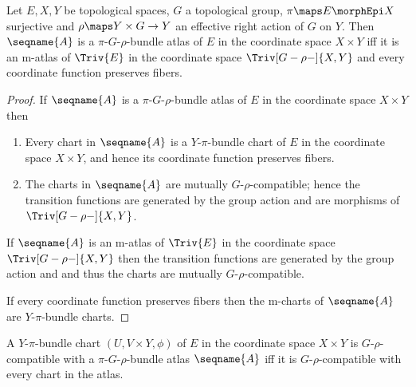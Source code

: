 \documentclass{article}
\begin{document}
\begin{lemma}
\label{lem:BunAtl}
Let $E,X,Y$ be topological spaces, $G$ a topological group,
$\pi \maps E \morphEpi X$ surjective and $\rho \maps Y \times G \to Y$ an
effective right action of $G$ on $Y$. Then $\seqname{A}$ is a
$\pi$-$G$-$\rho$-bundle atlas of $E$ in the coordinate space
$X \times Y$ iff it is an m-atlas of $\Triv{E}$ in the coordinate space
$\Triv[G-\rho-]{X,Y}$ and every coordinate function preserves fibers.

\begin{proof}
If $\seqname{A}$ is a $\pi$-$G$-$\rho$-bundle atlas of $E$ in the
coordinate space $X \times Y$ then
\begin{enumerate}
\item Every chart in $\seqname{A}$ is a $Y$-$\pi$-bundle chart of $E$ in
the coordinate space $X \times Y$, and hence its coordinate function
preserves fibers.
\item The charts in $\seqname{A}$ are mutually $G$-$\rho$-compatible;
hence the transition functions are generated by the group action and are
morphisms of $\Triv[G-\rho-]{X,Y}$.
\end{enumerate}

If $\seqname{A}$ is an m-atlas of $\Triv{E}$ in the coordinate space
$\Triv[G-\rho-]{X,Y}$ then the transition functions are generated by the
group action and and thus the charts are mutually $G$-$\rho$-compatible.

If every coordinate function preserves fibers then the m-charts of
$\seqname{A}$ are $Y$-$\pi$-bundle charts.
\end{proof}
\end{lemma}

\begin{definition}
A $Y$-$\pi$-bundle chart $(U, V \times Y, \phi)$ of $E$ in the
coordinate space $X \times Y$ is $G$-$\rho$-compatible with a
$\pi$-$G$-$\rho$-bundle atlas $\seqname{A}$ iff it is
$G$-$\rho$-compatible with every chart in the atlas.
\end{definition}
\end{document}
